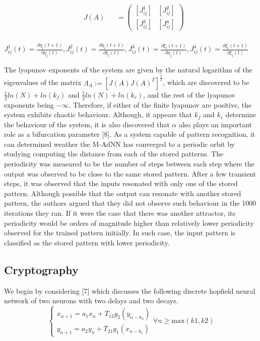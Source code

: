 \documentclass[12pt, letterpaper]{article}
\begin{document}
$$
\begin{aligned}
& J(A) &&= \begin{pmatrix}
  [J_{ij}^1] & [J_{ij}^2]\\
  [J_{ij}^3] & [J_{ij}^4]
  \end{pmatrix}\\
\end{aligned}
$$

$J_{ij}^1(t) = \frac{\partial \eta_i(t+1)}{\partial \eta_j(t)}, J_{ij}^2(t) = \frac{\partial \eta_i(t+1)}{\partial \xi_j(t)}, J_{ij}^3(t) = \frac{\partial \xi_i(t+1)}{\partial \eta_j(t)}, J_{ij}^4(t) = \frac{\partial \xi_i(t+1)}{\partial \xi_j(t)}$

The lyapunov exponents of the system are given by the natural logarithm of the eigenvalues of the matrix $\Lambda_A := [J(A)J(A)^T]^{\frac{1}{2}}$, which are discovered to be ${\frac{1}{2}}ln(N) + ln(k_f)$ and ${\frac{1}{2}}ln(N) + ln(k_r)$, and the rest of the lyapunov exponents being $-\infty$. Therefore, if either of the finite lyapunov are positive, the system exhibits chaotic behaviour. Although, it appears that $k_f$ and $k_r$ determine the behaviour of the system, it is also discovered that $\alpha$ also plays an important role as a bifurcation parameter [8]. As a system capable of pattern recognition, it can determined weather the M-AdNN has converged to a periodic orbit by studying computing the distance from each of the stored patterns. The periodicity was measured to be the number of steps between each step where the output was observed to be close to the same stored pattern. After a few transient steps, it was observed that the inputs resonated with only one of the stored pattern. Although possible that the output can resonate with another stored pattern, the authors argued that they did not observe such behaviour in the 1000 iterations they ran. If it were the case that there was another attractor, its periodicity would be orders of magnitude higher than relatively lower periodicity observed for the trained pattern initially. In such case, the input pattern is classified as the stored pattern with lower periodicity.


\subsection*{Cryptography}
We begin by considering [7] which discusses the following discrete hopfield neural network of two neurons with two delays and two decays.
\begin{equation}\label{hopfield network}
    \begin{cases}
    x_{n+1} = a_{1}x_{n} + T_{12}g_{2}(y_{n - k_{2}})\\
    y_{n+1} = a_{2}y_{n} + T_{21}g_{1}(x_{n - k_{1}})
    \end{cases} \forall n \geq \text{max}(k1, k2)
\end{equation}
\end{document}
